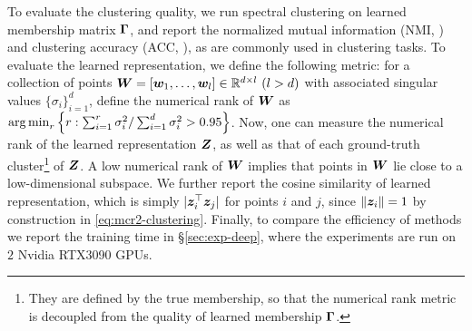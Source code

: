 \documentclass[10pt,twocolumn,letterpaper]{article}
\begin{document}
    To evaluate the clustering quality, we run spectral clustering on learned membership matrix $\boldsymbol{\Gamma}$, and report the normalized mutual information (NMI, \cite{Strehl2002-wx}) and clustering accuracy (ACC, \cite{Lee2015-lv}), as are commonly used in clustering tasks. To evaluate the learned representation, we define the following metric: for a collection of points  ${\bm{W}} = [{\bm{w}}_1, \ldots, {\bm{w}}_l]\in {\mathbb{R}}^{d \times l}\,\, (l>d)$ with associated singular values $\{\sigma_i\}_{i=1}^d$,
   define the numerical rank of ${\bm{W}}$ as $\operatorname*{arg\,min}_r\left\{r: \sum_{i=1}^r\sigma_i^2 / \sum_{i=1}^d\sigma_i^2>0.95\right\}$. Now, one can measure the numerical rank of the learned representation ${\bm{Z}}$, as well as that of each ground-truth cluster\footnote{They are defined by the true membership, so that the numerical rank metric is decoupled from the quality of learned membership $\boldsymbol{\Gamma}$.} of ${\bm{Z}}$. A low numerical rank of ${\bm{W}}$ implies that points in ${\bm{W}}$ lie close to a low-dimensional subspace. We further report the cosine similarity of learned representation, which is simply $|{\bm{z}}_i^\top {\bm{z}}_j|$ for points $i$ and $j$, since $\|{\bm{z}}_i\|=1$ by construction in \eqref{eq:mcr2-clustering}. Finally, to compare the efficiency of methods we report the training time in \S \ref{sec:exp-deep}, where the experiments are run on $2$ Nvidia RTX3090 GPUs.
   
\end{document}
